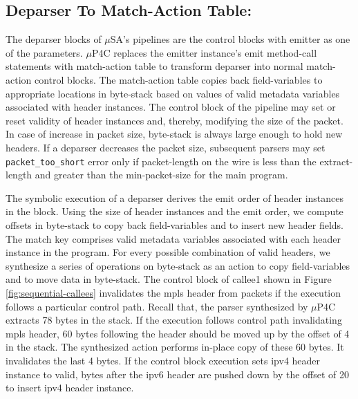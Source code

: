\subsection{Deparser To Match-Action Table:}
\label{subsection:deparser-to-match-action-table}
The deparser blocks of $\mu$SA's pipelines are the control blocks with emitter as one of the parameters.
$\mu$P4C replaces the emitter instance's emit method-call statements with match-action table to transform deparser into normal match-action control blocks.
The match-action table copies back field-variables to appropriate locations in byte-stack based on values of valid metadata variables associated with header instances. 
The control block of the pipeline may set or reset validity of header instances and, thereby, modifying the size of the packet.
In case of increase in packet size, byte-stack is always large enough to hold new headers.
If a deparser decreases the packet size, subsequent parsers may set \texttt{packet\_too\_short} error only if packet-length on the wire is less than the extract-length and greater than the min-packet-size for the main program.

The symbolic execution of a deparser derives the emit order of header instances in the block.
Using the size of header instances and the emit order, we compute offsets in byte-stack to copy back field-variables and to insert new header fields.
The match key comprises valid metadata variables associated with each header instance in the program.
For every possible combination of valid headers, we synthesize a series of operations on byte-stack as an action to copy field-variables and to move data in byte-stack.
The control block of callee1 shown in Figure \ref{fig:sequential-callees} invalidates the mpls header from packets if the execution follows a particular control path.
Recall that, the parser synthesized by $\mu$P4C extracts 78 bytes in the stack.
If the execution follows control path invalidating mpls header, 60 bytes following the header should be moved up by the offset of 4 in the stack.
The synthesized action performs in-place copy of these 60 bytes. It invalidates the last 4 bytes.
If the control block execution sets ipv4 header instance to valid, bytes after the ipv6 header are pushed down by the offset of 20 to insert ipv4 header instance.



